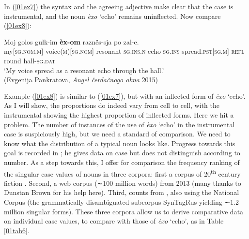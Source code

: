 \documentclass[output=paper,colorlinks,citecolor=brown]{langscibook}
\begin{document}
In (\ref{01ex7}) the syntax and the agreeing adjective make clear that the case is instrumental, and the noun \textit{èxo} `echo' remains uninflected. Now compare (\ref{01ex8}):

\begin{exe}
	\ex \label{01ex8}
	\gll Moj	golos	gulk-im	\textbf{èx-om} raznës-sja	po	zal-e. \\
	my\textsc{[sg.nom.m]}	voice\textsc{(m)[sg.nom]}	resonant-\textsc{sg.ins.n}	echo-\textsc{sg.ins} spread.\textsc{pst[sg.m]-refl}	round	hall-\textsc{sg.dat} \\
	\trans ‘My voice spread as a resonant echo through the hall.’ \\
	\hfill (Evgenija Pankratova, \textit{Angel čerdačnogo okna} 2015)
\end{exe}

Example (\ref{01ex8}) is similar to (\ref{01ex7}), but with an inflected form of \textit{èxo} `echo'. As I will show, the proportions do indeed vary from cell to cell, with the instrumental showing the highest proportion of inflected forms. Here we hit a problem. The number of instances of the use of
\textit{èxo} `echo' in the instrumental case is suspiciously high, but we need a standard of comparison. We need to know what the distribution of a typical  noun looks like. Progress towards this goal is recorded in \citet{kopotev2008}; he gives data on case but does not distinguish according to number. As a step towards this, I offer for comparison the frequency ranking of the singular case values of nouns in three corpora: first a corpus of 20\textsuperscript{th} century  fiction \citep{sharoff2006}. Second, a web corpus (∼100 million words) from 2013 (many thanks to Dunstan Brown for his help here). Third, counts from \citet[Table \ref{01tab6}]{slioussarsamoilova2015}, also using the  National Corpus (the grammatically disambiguated subcorpus SynTagRus yielding ∼1.2 million singular forms). These three corpora allow us to derive comparative data on individual case values, to compare with those of \textit{èxo} `echo', as in Table \ref{01tab6}.
\end{document}
